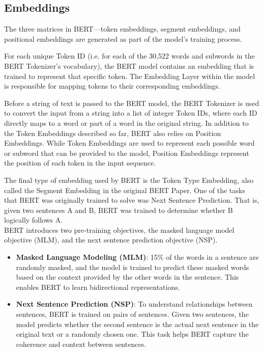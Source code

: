 \subsection{Embeddings}
The three matrices in BERT—token embeddings, segment embeddings, and positional embeddings are generated as part of the model's training process.

For each unique Token ID (i.e. for each of the 30,522 words and subwords in the BERT Tokenizer’s vocabulary), the BERT model contains an embedding that is trained to represent that specific token. The Embedding Layer within the model is responsible for mapping tokens to their corresponding embeddings.

Before a string of text is passed to the BERT model, the BERT Tokenizer is used to convert the input from a string into a list of integer Token IDs, where each ID directly maps to a word or part of a word in the original string. In addition to the Token Embeddings described so far, BERT also relies on Position Embeddings. While Token Embeddings are used to represent each possible word or subword that can be provided to the model, Position Embeddings represent the position of each token in the input sequence.

The final type of embedding used by BERT is the Token Type Embedding, also called the Segment Embedding in the original BERT Paper. One of the tasks that BERT was originally trained to solve was Next Sentence Prediction. That is, given two sentences A and B, BERT was trained to determine whether B logically follows A.\\

BERT introduces two pre-training objectives, the masked language model objective (MLM), and the next sentence prediction objective (NSP).


\begin{itemize}
    \item \textbf{Masked Language Modeling (MLM)}:
          15\% of the words in a sentence are randomly masked, and the model is trained to predict these masked words based on the context provided by the other words in the sentence. This enables BERT to learn bidirectional representations.

    \item \textbf{Next Sentence Prediction (NSP)}:
          To understand relationships between sentences, BERT is trained on pairs of sentences. Given two sentences, the model predicts whether the second sentence is the actual next sentence in the original text or a randomly chosen one. This task helps BERT capture the coherence and context between sentences.
\end{itemize}



